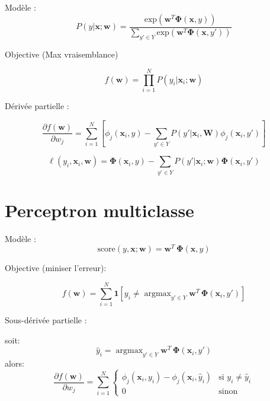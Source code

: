 \documentclass[11pt,openany]{book}
\begin{document}
Modèle : 
\begin{equation}
P(y|\mathbf{x};\mathbf{w}) =  \frac{\text{exp}(\mathbf{w}^T
    \boldsymbol\Phi(\mathbf{x},y)) }{\sum_{y'\in Y} \text{exp}(\mathbf{w}^T
    \boldsymbol\Phi(\mathbf{x},y'))}
\end{equation}

Objective (Max vraisemblance)

\begin{equation}
f(\mathbf{w}) =  \prod_{i=1}^N P(y_i|\mathbf{x}_i;\mathbf{w})
\end{equation}

Dérivée partielle : 

\begin{equation}
\frac{\partial f(\mathbf{w})}{\partial w_j} =  \sum_{i=1}^N \left[\phi_j(\mathbf{x}_{i},y) -
\sum_{y'\in Y} P(y'|\mathbf{x}_i,\mathbf{W}) \phi_j(\mathbf{x}_i,y') \right]
\end{equation}

\begin{displaymath}
\ell(y_i,\mathbf{x}_i,\mathbf{w}) = \boldsymbol\Phi(\mathbf{x}_{i},y)
-  \sum_{y'\in Y} P(y'|\mathbf{x}_i;\mathbf{w}) \boldsymbol\Phi(\mathbf{x}_i,y') 
\end{displaymath}


\section{Perceptron multiclasse}
    
Modèle : 
\begin{equation}
\text{score}(y,\mathbf{x};\mathbf{w}) =  \mathbf{w}^T \,
    \boldsymbol\Phi(\mathbf{x},y)
\end{equation}

Objective (miniser l'erreur): 

\begin{equation}
f(\mathbf{w}) = \sum_{i=1}^N \mathbf{1}[ y_i \not = \mathop{\text{argmax}}_{y' \in Y} \mathbf{w}^T \,
    \boldsymbol\Phi(\mathbf{x}_i,y') ]
\end{equation}

Sous-dérivée partielle : 

soit:
\begin{displaymath}
\hat{y}_i = \mathop{\text{argmax}}_{y' \in
  Y} \mathbf{w}^T \,
   \boldsymbol\Phi(\mathbf{x}_i,y') 
\end{displaymath}
alors:
\begin{equation}
\frac{\partial f(\mathbf{w})}{\partial w_j} =  
\sum_{i=1}^N \left\{
\begin{array}{ll}
\phi_j(\mathbf{x}_{i},y_i) - \phi_j(\mathbf{x}_{i},\hat{y}_i) &\text{si } y_i
\not = \hat{y}_i\\
0&\text{sinon}
\end{array}\right.
\end{equation}
\end{document}
